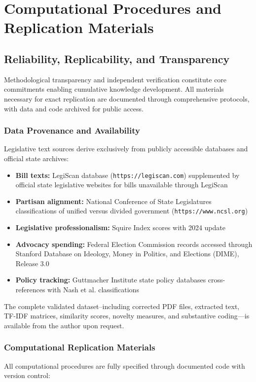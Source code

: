 \chapter{Computational Procedures and Replication Materials}
\section{Reliability, Replicability, and Transparency}
Methodological transparency and independent verification constitute core commitments enabling cumulative knowledge development. All materials necessary for exact replication are documented through comprehensive protocols, with data and code archived for public access.

\subsection{Data Provenance and Availability}
Legislative text sources derive exclusively from publicly accessible databases and official state archives:

\begin{itemize}
    \item \textbf{Bill texts:} LegiScan database (\texttt{https://legiscan.com}) supplemented by official state legislative websites for bills unavailable through LegiScan
    \item \textbf{Partisan alignment:} National Conference of State Legislatures classifications of unified versus divided government (\texttt{https://www.ncsl.org})
    \item \textbf{Legislative professionalism:} Squire Index scores\parencite{squireSquireIndexUpdate2024} with 2024 update
    \item \textbf{Advocacy spending:} Federal Election Commission records accessed through Stanford Database on Ideology, Money in Politics, and Elections (DIME), Release 3.0
    \item \textbf{Policy tracking:} Guttmacher Institute state policy databases cross-references with Nash et al.\parencite{nash13StatesHave2022} classifications
\end{itemize}

The complete validated dataset--including corrected PDF files, extracted text, TF-IDF matrices, similarity scores, novelty measures, and substantive coding---is available from the author upon request.

\subsection{Computational Replication Materials}
All computational procedures are fully specified through documented code with version control:

